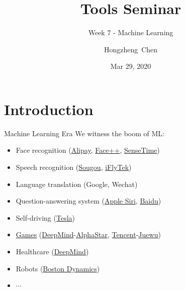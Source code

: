 \documentclass{../TexTemplate/myslide}
\title[ToolsSeminar]{Tools Seminar}
\subtitle{Week 7 - Machine Learning}
\author[chhzh123]{Hongzheng~Chen}
\date[Mar 29, 2020]{Mar 29, 2020}
\begin{document}
\begin{frame}
\titlepage
\end{frame}

\begin{frame}
\tableofcontents
\end{frame}

\section{Introduction}
\begin{frame}
\sectionpage
\end{frame}

\begin{frame}{Machine Learning Era}
We witness the boom of ML:
\begin{itemize}
	\item Face recognition (\href{https://intl.alipay.com/}{Alipay}, \href{https://www.faceplusplus.com/}{Face++}, \href{https://www.sensetime.com/}{SenseTime})
	\item Speech recognition (\href{https://zhiyin.sogou.com/}{Sougou}, \href{https://www.iflytek.com/}{iFlyTek})
	\item Language translation (Google, Wechat)
	\item Question-answering system (\href{https://www.apple.com/siri/}{Apple Siri}, \href{https://ai.baidu.com/}{Baidu})
	\item Self-driving (\href{https://www.tesla.com/}{Tesla})
	\item \href{https://deepmind.com/blog/article/capture-the-flag-science}{Games} (\href{https://deepmind.com/}{DeepMind}-\href{https://deepmind.com/blog/article/AlphaStar-Grandmaster-level-in-StarCraft-II-using-multi-agent-reinforcement-learning}{AlphaStar}, \href{https://ai.tencent.com/ailab/}{Tencent}-\href{https://ai.tencent.com/ailab/zh/news/detial?id=54}{Juewu})
	\item Healthcare (\href{https://deepmind.com/research/open-source/computational-predictions-of-protein-structures-associated-with-COVID-19}{DeepMind})
	\item Robots (\href{https://www.bostondynamics.com/}{Boston Dynamics})
	\item $\cdots$
\end{itemize}
\end{frame}
\end{document}
